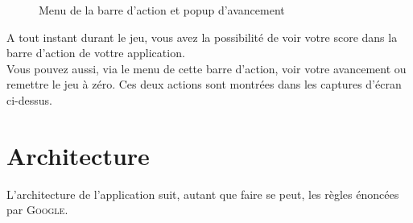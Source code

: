 \documentclass[11pt]{scrreprt}
\begin{document}
\begin{figure}[H]
{        }
        \caption{Menu de la barre d'action et popup d'avancement}
    \end{figure}

    A tout instant durant le jeu, vous avez la possibilité de voir votre score dans la barre d'action de vottre application.\\

    Vous pouvez aussi, via le menu de cette barre d'action, voir votre avancement ou remettre le jeu à zéro. Ces deux actions sont montrées dans les captures d'écran ci-dessus.

    \chapter{Architecture}
    L'architecture de l'application suit, autant que faire se peut, les règles énoncées par \textsc{Google}.\\
\end{document}
